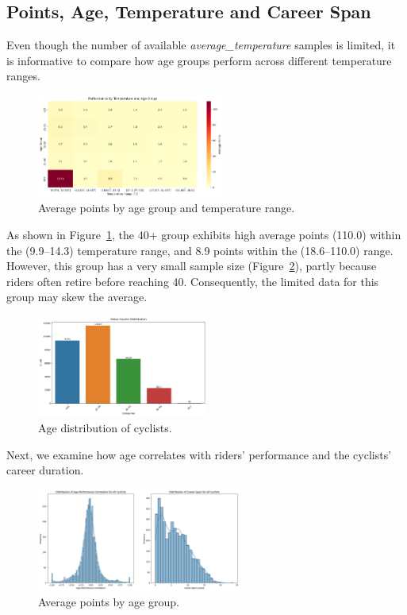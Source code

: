 \documentclass[a4paper, twoside,openright]{report}
\begin{document}
\subsection{Points, Age, Temperature and Career Span}
Even though the number of available \textit{average\_temperature} samples is limited, it is informative to compare how age groups perform across different temperature ranges.
\begin{figure}[ht]
    \centering
    \includegraphics[width=0.55\textwidth]{assets/perf_age_group.png}
    \caption{Average points by age group and temperature range.}
    \label{fig:temperature-age}
\end{figure}
As shown in Figure~\ref{fig:temperature-age}, the 40+ group exhibits high average points (110.0) within the (9.9--14.3) temperature range, and 8.9 points within the (18.6--110.0) range. However, this group has a very small sample size (Figure~\ref{fig:counts_age_group_with_temp}), partly because riders often retire before reaching 40. Consequently, the limited data for this group may skew the average.
\begin{figure}[ht]
    \centering
    \includegraphics[width=0.5\textwidth]{assets/counts_age_group.png}
    \caption{Age distribution of cyclists.}
    \label{fig:counts_age_group_with_temp}
\end{figure}
Next, we examine how age correlates with riders' performance and the cyclists' career duration.
\begin{figure}[ht]
    \centering
    \includegraphics[width=0.6\textwidth]{assets/distributions_rel.png}
    \caption{Average points by age group.}
    \label{fig:points-age}
\end{figure}
\end{document}
